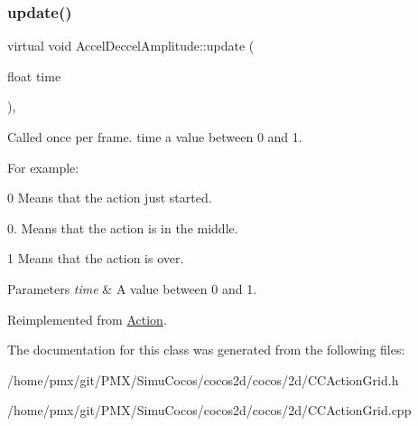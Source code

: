 \subsubsection{\texorpdfstring{update()}{update()}\hspace{0.1cm}{\footnotesize\ttfamily [2/2]}}
{\footnotesize\ttfamily virtual void Accel\+Deccel\+Amplitude\+::update (\begin{DoxyParamCaption}\item[{float}]{time }\end{DoxyParamCaption})\hspace{0.3cm}{\ttfamily [override]}, {\ttfamily [virtual]}}

Called once per frame. time a value between 0 and 1.

For example\+:
\begin{DoxyItemize}
\item 0 Means that the action just started.
\item 0. Means that the action is in the middle.
\item 1 Means that the action is over.
\end{DoxyItemize}


\begin{DoxyParams}{Parameters}
{\em time} & A value between 0 and 1. \\
\hline
\end{DoxyParams}


Reimplemented from \hyperlink{classAction_a937e646e63915e33ad05ba149bfcf239}{Action}.



The documentation for this class was generated from the following files\+:\begin{DoxyCompactItemize}
\item 
/home/pmx/git/\+P\+M\+X/\+Simu\+Cocos/cocos2d/cocos/2d/C\+C\+Action\+Grid.\+h\item 
/home/pmx/git/\+P\+M\+X/\+Simu\+Cocos/cocos2d/cocos/2d/C\+C\+Action\+Grid.\+cpp\end{DoxyCompactItemize}
